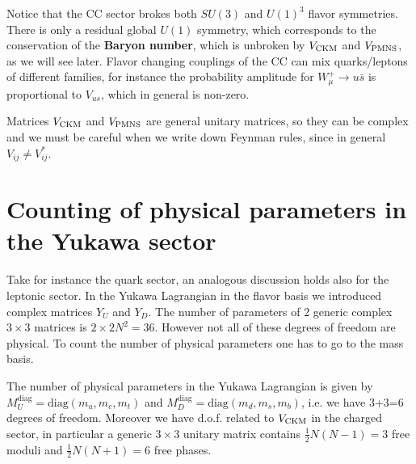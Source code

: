 \documentclass[TheoreticalPhy_ModB.tex]{subfiles}
\begin{document}
Notice that the CC sector brokes both $SU(3)$ and $U(1)^3$ flavor symmetries. There is only a residual global $U(1)$ symmetry, which corresponds to the conservation of the \textbf{Baryon number}, which is unbroken by $V_{\text{CKM}}$ and $V_{\text{PMNS}}$, as we will see later. Flavor changing couplings of the CC can mix quarks/leptons of different families, for instance the probability amplitude for $W_\mu^+\to u\bar s$ is proportional to $V_{us}$, which in general is non-zero. 

Matrices $V_{\text{CKM}}$ and $V_{\text{PMNS}}$ are general unitary matrices, so they can be complex and we must be careful when we write down Feynman rules, since in general $V_{ij}\neq V_{ij}^*$. 


\section{Counting of physical parameters in the Yukawa sector}

Take for instance the quark sector, an analogous discussion holds also for the leptonic sector. In the Yukawa Lagrangian in the flavor basis we introduced complex matrices $Y_U$ and $Y_D$. The number of parameters of 2 generic complex $3\times 3$ matrices is $2\times 2N^2=36$. However not all of these degrees of freedom are physical. To count the number of physical parameters one has to go to the mass basis. 

The number of physical parameters in the Yukawa Lagrangian is given by $M_U^{\text{diag}}=\text{diag}(m_u,m_c,m_t)$ and $M_D^{\text{diag}}=\text{diag}(m_d,m_s,m_b)$, i.e. we have 3+3=6 degrees of freedom. Moreover we have d.o.f. related to $V_{\text{CKM}}$ in the charged sector, in particular a generic $3\times3$ unitary matrix contains $\frac12N(N-1)=3$ free moduli and $\frac12N(N+1)=6$ free phases. 
\end{document}
